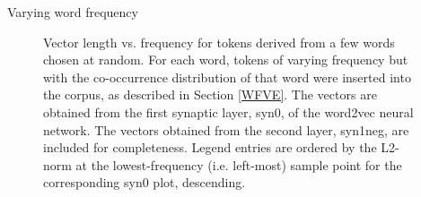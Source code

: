 \documentclass{article} %
\begin{document}
\begin{section}{Varying word frequency}
\begin{figure}
	\caption{ Vector length vs. frequency for tokens derived from a
          few words chosen at random.  For each word, tokens of varying
          frequency but with the co-occurrence distribution of that word
          were inserted into the corpus, as described in
          Section \ref{WFVE}.  The vectors are obtained from the first
          synaptic layer, syn0, of the word2vec neural network.  The
          vectors obtained from the second layer, syn1neg, are
          included for completeness.
	  Legend entries are ordered by the L2-norm at the lowest-frequency
  (i.e. left-most) sample point for the corresponding syn0 plot, descending.}
	\label{fig:word-frequency-experiment-graph}
\end{figure}
\end{section}
\end{document}
